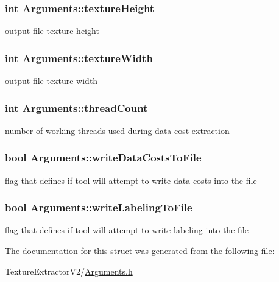 \subsubsection[{texture\+Height}]{\setlength{\rightskip}{0pt plus 5cm}int Arguments\+::texture\+Height}\label{struct_arguments_acba64f044d4603abac85ba2cf1b50b75}
output file texture height \hypertarget{struct_arguments_a53b1eb430f4ea67ffd9a85696a295cd0}{}
\subsubsection[{texture\+Width}]{\setlength{\rightskip}{0pt plus 5cm}int Arguments\+::texture\+Width}\label{struct_arguments_a53b1eb430f4ea67ffd9a85696a295cd0}
output file texture width \hypertarget{struct_arguments_a81212a8036b56467011fb90c075ec4d8}{}
\subsubsection[{thread\+Count}]{\setlength{\rightskip}{0pt plus 5cm}int Arguments\+::thread\+Count}\label{struct_arguments_a81212a8036b56467011fb90c075ec4d8}
number of working threads used during data cost extraction \hypertarget{struct_arguments_a3f797aec500d79580f523addf2a62786}{}
\subsubsection[{write\+Data\+Costs\+To\+File}]{\setlength{\rightskip}{0pt plus 5cm}bool Arguments\+::write\+Data\+Costs\+To\+File}\label{struct_arguments_a3f797aec500d79580f523addf2a62786}
flag that defines if tool will attempt to write data costs into the file \hypertarget{struct_arguments_ac81dde9796306362b5c06f2d62a901ea}{}
\subsubsection[{write\+Labeling\+To\+File}]{\setlength{\rightskip}{0pt plus 5cm}bool Arguments\+::write\+Labeling\+To\+File}\label{struct_arguments_ac81dde9796306362b5c06f2d62a901ea}
flag that defines if tool will attempt to write labeling into the file 

The documentation for this struct was generated from the following file\+:\begin{DoxyCompactItemize}
\item 
Texture\+Extractor\+V2/\hyperlink{_arguments_8h}{Arguments.\+h}\end{DoxyCompactItemize}

